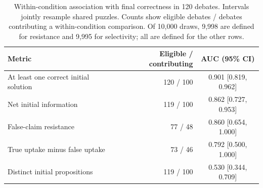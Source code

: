 \begin{table}[t]
\centering\small
\setlength{\tabcolsep}{3pt}
\caption{Within-condition association with final correctness in 120 debates. Intervals jointly resample shared puzzles. Counts show eligible debates / debates contributing a within-condition comparison. Of 10,000 draws, 9,998 are defined for resistance and 9,995 for selectivity; all are defined for the other rows.}
\label{tab:debate-metric-auc}
\begin{tabularx}{\linewidth}{@{}Xrc@{}}
\toprule
Metric & Eligible / contributing & AUC (95\% CI) \\
\midrule
At least one correct initial solution & 120 / 100 & 0.901 [0.819, 0.962] \\
Net initial information & 119 / 100 & 0.862 [0.727, 0.953] \\
False-claim resistance & 77 / 48 & 0.860 [0.654, 1.000] \\
True uptake minus false uptake & 73 / 46 & 0.792 [0.500, 1.000] \\
Distinct initial propositions & 119 / 100 & 0.530 [0.344, 0.709] \\
\bottomrule
\end{tabularx}
\end{table}
